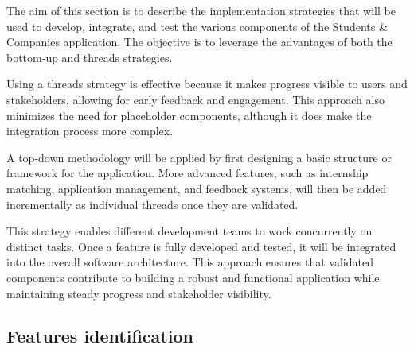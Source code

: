 The aim of this section is to describe the implementation strategies that will be used to develop, integrate, and test the various components of the Students & Companies application. The objective is to leverage the advantages of both the bottom-up and threads strategies.

Using a threads strategy is effective because it makes progress visible to users and stakeholders, allowing for early feedback and engagement. This approach also minimizes the need for placeholder components, although it does make the integration process more complex.

A top-down methodology will be applied by first designing a basic structure or framework for the application. More advanced features, such as internship matching, application management, and feedback systems, will then be added incrementally as individual threads once they are validated.

This strategy enables different development teams to work concurrently on distinct tasks. Once a feature is fully developed and tested, it will be integrated into the overall software architecture. This approach ensures that validated components contribute to building a robust and functional application while maintaining steady progress and stakeholder visibility.

\subsection{Features identification}